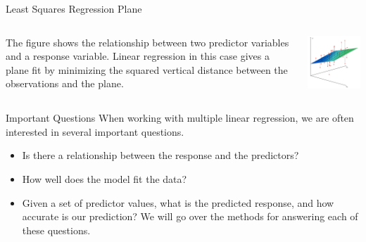 \documentclass[
  ignorenonframetext,
  aspectratio=169,
]{beamer}
\begin{document}
\begin{frame}{Least Squares Regression Plane}
\protect\hypertarget{least-squares-regression-plane}{}
\begin{columns}[T]
\begin{column}{0.5\textwidth}
The figure shows the relationship between two predictor variables and a
response variable. Linear regression in this case gives a plane fit by
minimizing the squared vertical distance between the observations and
the plane.
\end{column}

\begin{column}{0.5\textwidth}
\includegraphics[width=2.59375in,height=\textheight]{images/regression_plane.png}
\end{column}
\end{columns}
\end{frame}

\begin{frame}{Important Questions}
\protect\hypertarget{important-questions}{}
When working with multiple linear regression, we are often interested in
several important questions.

\begin{itemize}
\item
  Is there a relationship between the response and the predictors?
\item
  How well does the model fit the data?
\item
  Given a set of predictor values, what is the predicted response, and
  how accurate is our prediction? We will go over the methods for
  answering each of these questions.
\end{itemize}
\end{frame}
\end{document}
